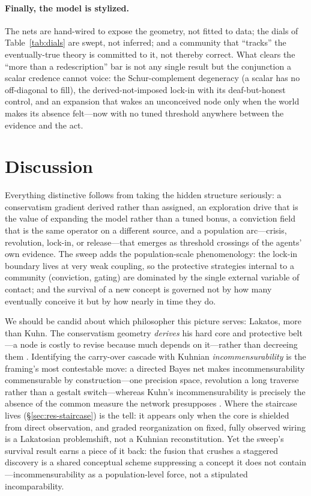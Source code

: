\documentclass[11pt]{article}
\begin{document}
\paragraph{Finally, the model is stylized.}
The nets are hand-wired to expose the geometry, not fitted to data; the dials of
Table~\ref{tab:dials} are swept, not inferred; and a community that ``tracks'' the eventually-true
theory is committed to it, not thereby correct. What clears the ``more than a redescription'' bar
is not any single result but the conjunction a scalar credence cannot voice: the Schur-complement
degeneracy (a scalar has no off-diagonal to fill), the derived-not-imposed lock-in with its
deaf-but-honest control, and an expansion that wakes an unconceived node only when the world makes
its absence felt---now with no tuned threshold anywhere between the evidence and the act.

\section{Discussion}
\label{sec:discussion}

Everything distinctive follows from taking the hidden structure seriously: a conservatism gradient
derived rather than assigned, an exploration drive that is the value of expanding the model rather
than a tuned bonus, a conviction field that is the same operator on a different source, and a
population arc---crisis, revolution, lock-in, or release---that emerges as threshold crossings of the
agents' own evidence. The sweep adds the population-scale phenomenology: the lock-in boundary lives
at very weak coupling, so the protective strategies internal to a community (conviction, gating) are
dominated by the single external variable of contact; and the survival of a new concept is governed
not by how many eventually conceive it but by how nearly in time they do.

We should be candid about which philosopher this picture serves: Lakatos, more than Kuhn. The
conservatism geometry \emph{derives} his hard core and protective belt---a node is costly to revise
because much depends on it---rather than decreeing them \citep{lakatos1970}. Identifying the
carry-over cascade with Kuhnian \emph{incommensurability} is the framing's most contestable move: a
directed Bayes net makes incommensurability commensurable by construction---one precision space,
revolution a long traverse rather than a gestalt switch---whereas Kuhn's incommensurability is
precisely the absence of the common measure the network presupposes \citep{kuhn1983}. Where the
staircase lives (\S\ref{sec:res-staircase}) is the tell: it appears only when the core is shielded
from direct observation, and graded reorganization on fixed, fully observed wiring is a Lakatosian
problemshift, not a Kuhnian reconstitution. Yet the sweep's survival result earns a piece of it
back: the fusion that crushes a staggered discovery is a shared conceptual scheme suppressing a
concept it does not contain---incommensurability as a population-level force, not a stipulated
incomparability.
\end{document}
